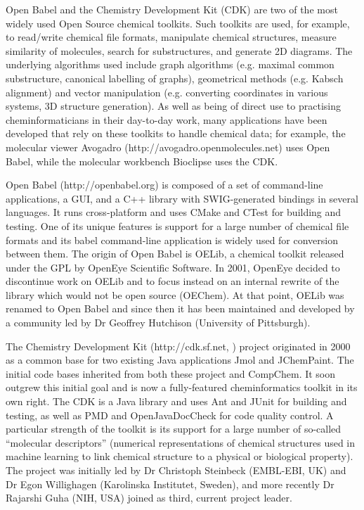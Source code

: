 \documentclass{sig-alternate}
\begin{document}
Open Babel and the Chemistry Development Kit (CDK) are two of the most widely
used Open Source chemical toolkits. Such toolkits are used, for example, to
read/write chemical file formats, manipulate chemical structures, measure
similarity of molecules, search for substructures, and generate 2D diagrams. The
underlying algorithms used include graph algorithms (e.g. maximal common
substructure, canonical labelling of graphs), geometrical methods (e.g. Kabsch
alignment) and vector manipulation (e.g. converting coordinates in various
systems, 3D structure generation). As well as being of direct use to practising
cheminformaticians in their day-to-day work, many applications have been
developed that rely on these toolkits to handle chemical data; for example, the
molecular viewer Avogadro (http://avogadro.openmolecules.net) uses Open Babel,
while the molecular workbench Bioclipse \cite{Bioclipse2} uses the CDK.
 
Open Babel (http://openbabel.org) is composed of a set of command-line
applications, a GUI, and a C++ library with SWIG-generated bindings in several
languages. It runs cross-platform and uses CMake and CTest for building and
testing. One of its unique features is support for a large number of chemical
file formats and its babel command-line application is widely used for
conversion between them. The origin of Open Babel is OELib, a chemical toolkit
released under the GPL by OpenEye Scientific Software. In 2001, OpenEye decided
to discontinue work on OELib and to focus instead on an internal rewrite of the
library which would not be open source (OEChem). At that point, OELib was
renamed to Open Babel and since then it has been maintained and developed by a
community led by Dr Geoffrey Hutchison (University of Pittsburgh).

The Chemistry Development Kit (http://cdk.sf.net, \cite{Steinbeck2006}) project
originated in 2000 as a common base for two existing Java applications Jmol and
JChemPaint. The initial code bases inherited from both these project and
CompChem. It soon outgrew this initial goal and is now a fully-featured
cheminformatics toolkit in its own right. The CDK is a Java library and uses Ant
and JUnit for building and testing, as well as PMD and OpenJavaDocCheck for code
quality control. A particular strength of the toolkit is its support for a large
number of so-called “molecular descriptors” (numerical representations of
chemical structures used in machine learning to link chemical structure to a
physical or biological property). The project was initially led by Dr Christoph
Steinbeck (EMBL-EBI, UK) and Dr Egon Willighagen (Karolinska Institutet,
Sweden), and more recently Dr Rajarshi Guha (NIH, USA) joined as third, current
project leader.
\end{document}
